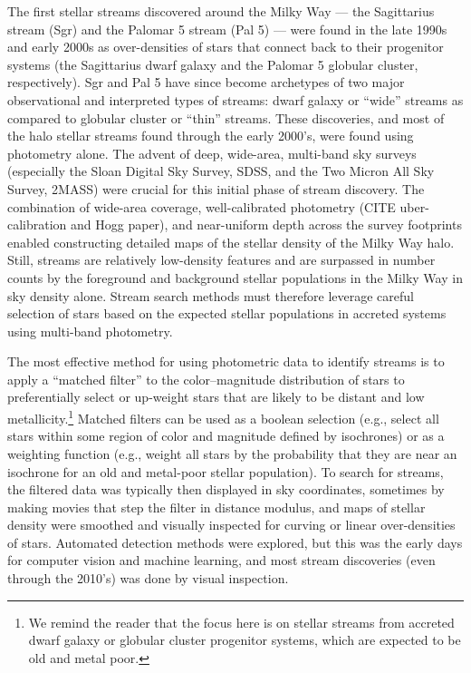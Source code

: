 \documentclass[final,5p,times,twocolumn,authoryear]{elsarticle}
\begin{document}
The first stellar streams discovered around the Milky Way --- the Sagittarius stream
(Sgr) and the Palomar 5 stream (Pal 5) --- were found in the late 1990s and early 2000s
as over-densities of stars that connect back to their progenitor systems (the
Sagittarius dwarf galaxy and the Palomar 5 globular cluster, respectively).
Sgr and Pal 5 have since become archetypes of two major observational and interpreted
types of streams: dwarf galaxy or ``wide'' streams as compared to globular cluster or
``thin'' streams.
These discoveries, and most of the halo stellar streams found through the early 2000's,
were found using photometry alone.
The advent of deep, wide-area, multi-band sky surveys (especially the Sloan Digital Sky
Survey, SDSS, and the Two Micron All Sky Survey, 2MASS) were crucial for this initial
phase of stream discovery.
The combination of wide-area coverage, well-calibrated photometry (CITE uber-calibration
and Hogg paper), and near-uniform depth across the survey footprints enabled
constructing detailed maps of the stellar density of the Milky Way halo.
Still, streams are relatively low-density features and are surpassed in number counts by
the foreground and background stellar populations in the Milky Way in sky density alone.
Stream search methods must therefore leverage careful selection of stars based on the
expected stellar populations in accreted systems using multi-band photometry.

The most effective method for using photometric data to identify streams is to apply a
``matched filter'' \citep{Rockosi:2002:MatchedFilterAnalysisTidal} to the color--magnitude distribution of stars
to preferentially select or up-weight stars that are likely to be distant and low
metallicity.\footnote{We remind the reader that the focus here is on stellar streams
from accreted dwarf galaxy or globular cluster progenitor systems, which are expected to
be old and metal poor.}
Matched filters can be used as a boolean selection (e.g., select all stars within some
region of color and magnitude defined by isochrones) or as a weighting function (e.g.,
weight all stars by the probability that they are near an isochrone for an old and
metal-poor stellar population).
To search for streams, the filtered data was typically then displayed in sky
coordinates, sometimes by making movies that step the filter in distance modulus, and
maps of stellar density were smoothed and visually inspected for curving or linear
over-densities of stars.
Automated detection methods were explored, but this was the early days for computer
vision and machine learning, and most stream discoveries (even through the 2010's) was
done by visual inspection.
\end{document}
